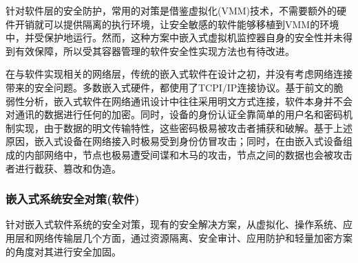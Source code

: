 \documentclass[12pt, a4paper]{article}
\begin{document}
	针对软件层的安全防护，常用的对策是借鉴虚拟化(VMM)技术，不需要额外的硬件开销就可以提供隔离的执行环境，让安全敏感的软件能够移植到VMM的环境中，并受保护地运行。然而，这种方案中嵌入式虚拟机监控器自身的安全性并未得到有效保障，所以受其容器管理的软件安全性实现方法也有待改进。
	
	在与软件实现相关的网络层，传统的嵌入式软件在设计之初，并没有考虑网络连接带来的安全问题。多数嵌入式硬件，都使用了TCPI/IP连接协议。基于前文的脆弱性分析，嵌入式软件在网络通讯设计中往往采用明文方式连接，软件本身并不会对通讯的数据进行任何的加密。同时，设备的身份认证全靠简单的用户名和密码机制实现，由于数据的明文传输特性，这些密码极易被攻击者捕获和破解。基于上述原因，嵌入式设备在网络接入时极易受到身份仿冒攻击；同时，在由嵌入式设备组成的内部网络中，节点也极易遭受间谍和木马的攻击，节点之间的数据也会被攻击者进行截获、篡改和伪造。
	
	\subsubsection{嵌入式系统安全对策(软件)}
	针对嵌入式软件系统的安全对策，现有的安全解决方案，从虚拟化、操作系统、应用层和网络传输层几个方面，通过资源隔离、安全审计、应用防护和轻量加密方案的角度对其进行安全加固。
	
\end{document}
